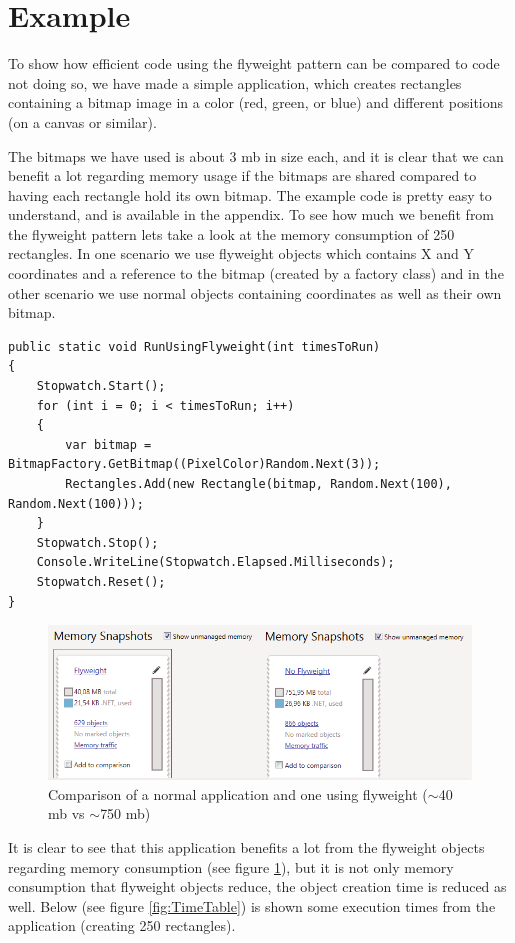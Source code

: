 \section{Example}
To show how efficient code using the flyweight pattern can be compared to code not doing so, we have made a simple application, which creates rectangles containing a bitmap image in a color (red, green, or blue) and different positions (on a canvas or similar).


The bitmaps we have used is about 3 mb in size each, and it is clear that we can benefit a lot regarding memory usage if the bitmaps are shared compared to having each rectangle hold its own bitmap.
The example code is pretty easy to understand, and is available in the appendix.
To see how much we benefit from the flyweight pattern lets take a look at the memory consumption of 250 rectangles. In one scenario we use flyweight objects which contains X and Y coordinates and a reference to the bitmap (created by a factory class) and in the other scenario we use normal objects containing coordinates as well as their own bitmap.
\lstset{language=C++}
\begin{lstlisting}[caption=The "testrun" using flyweight]
public static void RunUsingFlyweight(int timesToRun)
{
	Stopwatch.Start();
	for (int i = 0; i < timesToRun; i++)
	{
		var bitmap = BitmapFactory.GetBitmap((PixelColor)Random.Next(3));
		Rectangles.Add(new Rectangle(bitmap, Random.Next(100), Random.Next(100)));
	}
	Stopwatch.Stop();
	Console.WriteLine(Stopwatch.Elapsed.Milliseconds);
	Stopwatch.Reset();
}
\end{lstlisting}
\begin{figure}[h]
\centering
\includegraphics[width=0.7\linewidth]{Content/Flyweight_Stats}
\caption{Comparison of a normal application and one using flyweight ($\sim$40 mb vs $\sim$750 mb)}
\label{fig:Flyweight_Stats}
\end{figure}
It is clear to see that this application benefits a lot from the flyweight objects regarding memory consumption (see figure \ref{fig:Flyweight_Stats}), but it is not only memory consumption that flyweight objects reduce, the object creation time is reduced as well. Below (see figure \ref{fig:TimeTable}) is shown some execution times from the application (creating 250 rectangles).
